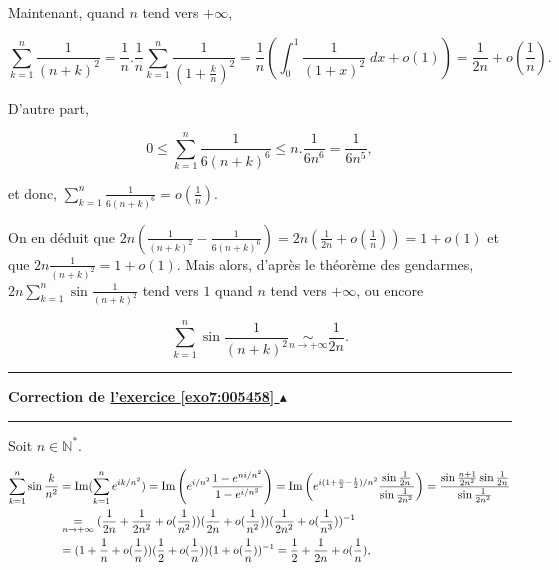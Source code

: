 \documentclass[11pt,a4paper]{article}
\newcommand{\Nn}{\mathbb{N}} \newcommand{\N}{\mathbb{N}}
\newcounter{exo}
\newcommand{\correction}[1]{\hypertarget{cor7:#1}{}\label{cor7:#1}{\bf Correction de \hyperlink{exo7:#1}{l'exercice \ref{exo7:#1} $\blacktriangle$}}\vspace{1mm}\hrule\vspace{1mm}}
\newcommand{\fincorrection}{\vspace{1mm}\hrule\vspace*{7mm}}
\begin{document}
Maintenant, quand $n$ tend vers $+\infty$,

$$\sum_{k=1}^{n}\frac{1}{(n+k)^2}=\frac{1}{n}.\frac{1}{n}\sum_{k=1}^{n}\frac{1}{(1+\frac{k}{n})^2}
=\frac{1}{n}\left(\int_{0}^{1}\frac{1}{(1+x)^2}\;dx+o(1)\right)=\frac{1}{2n}+o(\frac{1}{n}).$$

D'autre part,

$$0\leq\sum_{k=1}^{n}\frac{1}{6(n+k)^6}\leq n.\frac{1}{6n^6}=\frac{1}{6n^5},$$

et donc, $\sum_{k=1}^{n}\frac{1}{6(n+k)^6}=o(\frac{1}{n})$.

On en déduit que $2n(\frac{1}{(n+k)^2}-\frac{1}{6(n+k)^6})=2n(\frac{1}{2n}+o(\frac{1}{n}))=1+o(1)$ et que $2n\frac{1}{(n+k)^2}=1+o(1)$. Mais alors, d'après le théorème des gendarmes, $2n\sum_{k=1}^{n}\sin\frac{1}{(n+k)^2}$ tend vers $1$ quand $n$ tend vers $+\infty$, ou encore

$$\sum_{k=1}^{n}\sin\frac{1}{(n+k)^2}\underset{n\rightarrow+\infty}{\sim}\frac{1}{2n}.$$
\fincorrection
\correction{005458}
Soit $n\in\Nn^*$.

\begin{align*}\ensuremath
\sum_{k=1}^{n}\sin\frac{k}{n^2}&=\mbox{Im}(\sum_{k=1}^{n}e^{ik/n^2})=\mbox{Im}\left(e^{i/n^2}\frac{1-e^{ni/n^2}}{1-e^{i/n^2}}\right)
=\mbox{Im}\left(e^{i(1+\frac{n}{2}-\frac{1}{2})/n^2}\frac{\sin\frac{1}{2n}}{\sin\frac{1}{2n^2}}\right)
=\frac{\sin\frac{n+1}{2n^2}\sin\frac{1}{2n}}{\sin\frac{1}{2n^2}}\\
 &\underset{n\rightarrow+\infty}{=}(\frac{1}{2n}+\frac{1}{2n^2}+o(\frac{1}{n^2}))(\frac{1}{2n}+o(\frac{1}{n^2}))(\frac{1}{2n^2}+o(\frac{1}{n^3}))^{-1}\\
 &=(1+\frac{1}{n}+o(\frac{1}{n}))(\frac{1}{2}+o(\frac{1}{n}))(1+o(\frac{1}{n}))^{-1}=\frac{1}{2}+\frac{1}{2n}
 +o(\frac{1}{n}),
\end{align*}
\end{document}
